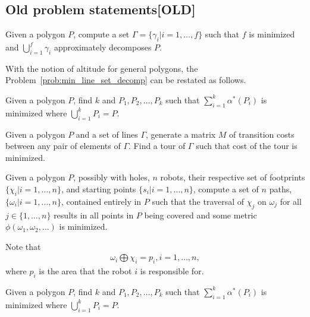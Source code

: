 \documentclass[../main.tex]{subfiles}
\begin{document}
\subsection{Old problem statements[OLD]}

\begin{problem}
\label{prob:min_line_set_decomp}
Given a polygon $P$, compute a set $\Gamma = \{\gamma_i|i=1,\ldots,f\}$ such that $f$ is minimized and $\bigcup^f_{i=1}\gamma_i$ approximately decomposes $P$.
\end{problem}

With the notion of altitude for general polygons, the Problem~\ref{prob:min_line_set_decomp} can be restated as follows.
\begin{problem}
\label{prob:min_lin_num_decomp_3}
Given a polygon $P$, find $k$ and $P_1,P_2,\ldots,P_k$ such that $\sum^k_{i=1}\alpha^*(P_i)$ is minimized where $\bigcup^k_{i=1}P_i=P$.
\end{problem}

\begin{problem}
\label{prob:min_tour}
Given a polygon $P$ and a set of lines $\Gamma$, generate a matrix $M$ of transition costs between any pair of elements of $\Gamma$. Find a tour of $\Gamma$ such that cost of the tour is minimized.
\end{problem}



\begin{problem}
\label{prb:distributed_cpp}

	Given a polygon $P$, possibly with holes, $n$ robots, their respective set of footprints $\{\chi_i|i=1,\ldots,n\}$, and starting points $\{s_i|i=1,\ldots,n\}$, compute a set of $n$ paths, $\{\omega_i|i=1,\ldots,n\}$, contained entirely in $P$ such that the traversal of $\chi_j$ on $\omega_j$ for all $j\in\{1,\ldots,n\}$ results in all points in $P$ being covered and some metric $\phi(\omega_1,\omega_2,\ldots)$ is minimized.
\end{problem}

Note that
\begin{equation}
	\begin{aligned}
		\omega_i\bigoplus\chi_i=p_i, i=1,\ldots,n,
	\end{aligned}
\end{equation}
where $p_i$ is the area that the robot $i$ is responsible for.


\begin{problem}
\label{prob:min_lin_num_decomp_3}
	
Given a polygon $P$, find $k$ and $P_1,P_2,\ldots,P_k$ such that $\sum^k_{i=1}\alpha^*(P_i)$ is minimized where $\bigcup^k_{i=1}P_i=P$.
\end{problem}
\end{document}
